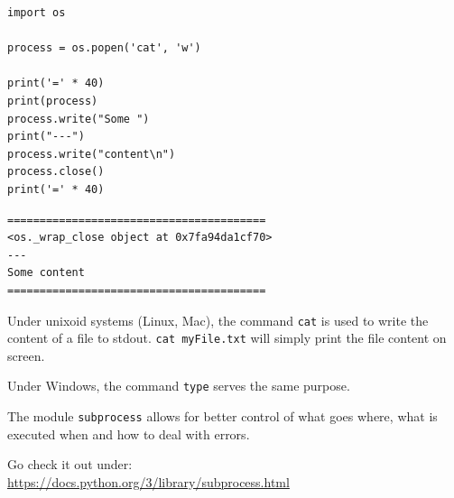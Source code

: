 
\begin{frame}[fragile]
%
\begin{tcbraster}[raster columns=2,
                  raster equal height,
                  nobeforeafter,
                  raster column skip=0.5cm]
\begin{codebox}
\begin{verbatim}
import os

process = os.popen('cat', 'w')

print('=' * 40)
print(process)
process.write("Some ")
print("---")
process.write("content\n")
process.close()
print('=' * 40)
\end{verbatim}
\end{codebox}
%
\begin{cmdbox}
\begin{verbatim}
========================================
<os._wrap_close object at 0x7fa94da1cf70>
---
Some content
========================================
\end{verbatim}
\end{cmdbox}
\end{tcbraster}

\begin{hintbox}
\small
Under unixoid systems (Linux, Mac), the command \texttt{cat} is used to write the content of a file to stdout. \texttt{cat myFile.txt} will simply print the file content on screen.

Under Windows, the command \texttt{type} serves the same purpose.
\end{hintbox}
%
\end{frame}


\begin{frame}
%
\begin{hintbox}
The module \texttt{subprocess} allows for better control of what goes where, what is executed when and how to deal with errors.

Go check it out under:\\
\url{https://docs.python.org/3/library/subprocess.html} 
\end{hintbox}
%
\end{frame}

